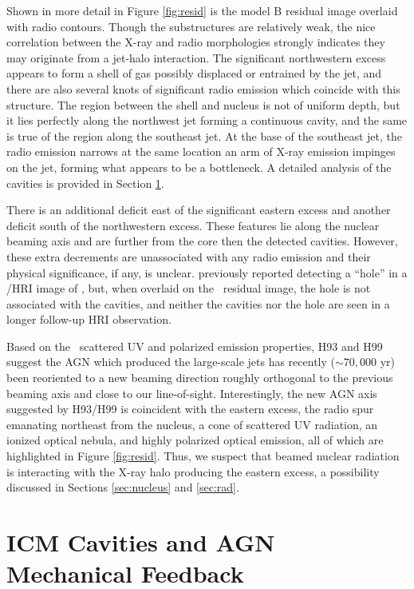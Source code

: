 \documentclass[useAMS,usenatbib]{mn2e}
\begin{document}
Shown in more detail in Figure \ref{fig:resid} is the model B residual
image overlaid with radio contours. Though the substructures are
relatively weak, the nice correlation between the X-ray and radio
morphologies strongly indicates they may originate from a jet-halo
interaction. The significant northwestern excess appears to form a
shell of gas possibly displaced or entrained by the jet, and there are
also several knots of significant radio emission which coincide with
this structure. The region between the shell and nucleus is not of
uniform depth, but it lies perfectly along the northwest jet forming a
continuous cavity, and the same is true of the region along the
southeast jet. At the base of the southeast jet, the radio emission
narrows at the same location an arm of X-ray emission impinges on the
jet, forming what appears to be a bottleneck. A detailed analysis of
the cavities is provided in Section \ref{sec:cavs}.

There is an additional deficit east of the significant eastern excess
and another deficit south of the northwestern excess. These features
lie along the nuclear beaming axis and are further from the core then
the detected cavities. However, these extra decrements are
unassociated with any radio emission and their physical significance,
if any, is unclear. \citet{1995MNRAS.274L..63F} previously reported
detecting a ``hole'' in a \rosat/HRI image of \irs, but, when overlaid
on the \cxo\ residual image, the hole is not associated with the
cavities, and neither the cavities nor the hole are seen in a longer
follow-up HRI observation.

Based on the \irs\ scattered UV and polarized emission properties, H93
and H99 suggest the AGN which produced the large-scale jets has
recently ($\sim 70,000$ yr) been reoriented to a new beaming direction
roughly orthogonal to the previous beaming axis and close to our
line-of-sight. Interestingly, the new AGN axis suggested by H93/H99 is
coincident with the eastern excess, the radio spur emanating northeast
from the nucleus, a cone of scattered UV radiation, an ionized optical
nebula, and highly polarized optical emission, all of which are
highlighted in Figure \ref{fig:resid}. Thus, we suspect that beamed
nuclear radiation is interacting with the X-ray halo producing the
eastern excess, a possibility discussed in Sections \ref{sec:nucleus}
and \ref{sec:rad}.

\section{ICM Cavities and AGN Mechanical Feedback}
\label{sec:cavs}
\end{document}
